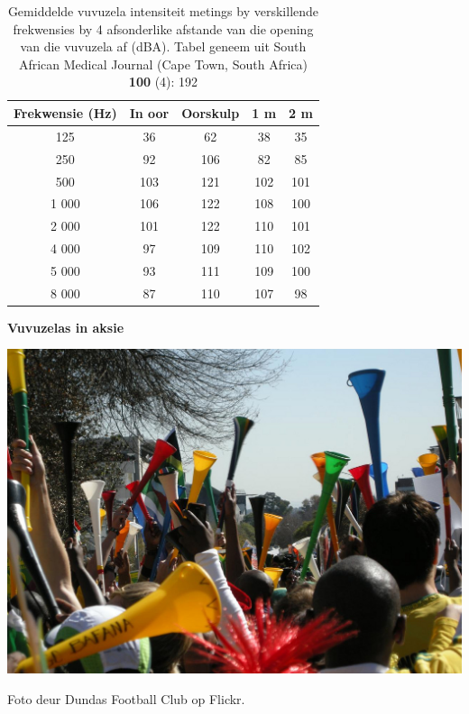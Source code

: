 \begin{minipage}{.5\textwidth}
\begin{table}[H]
\begin{tabular}{ccccc}\hline
Frekwensie (Hz) & In oor & Oorskulp & 1 m & 2 m \\ \hline
125&   36  	&62	 &38	& 35 \\ \hline
250&	92 &	106	& 82	&	 85 \\ \hline
500&	103 & 121&	 102&	 101 		\\ \hline
1 000&	106 & 122&	 108&	 100 	\\  \hline
2 000&	101 & 122&	 110&	 101 	\\ \hline
4 000&	97 & 109&	 110&	 102 	\\ \hline
5 000&	93 & 111&	 109&	 100 		\\ \hline
8 000&  87 & 110&	 107&		 98 	\\ \hline
\end{tabular}
\label{table:vuvuzelas}
\caption{Gemiddelde vuvuzela intensiteit metings by verskillende frekwensies by 4 afsonderlike afstande van die opening van die vuvuzela af (dBA). Tabel geneem uit South African Medical Journal (Cape Town, South Africa) \textbf{100} (4): 192}
\end{table}
\end{minipage}
\begin{minipage}{.5\textwidth}
\begin{center}
\textbf{Vuvuzelas in aksie}\par
\includegraphics[width=.8\columnwidth]{../Grade10/photos/vuvuzelas_dundas_football_club.jpg}\par
Foto deur Dundas Football Club op Flickr.	
\end{center}
\end{minipage}

